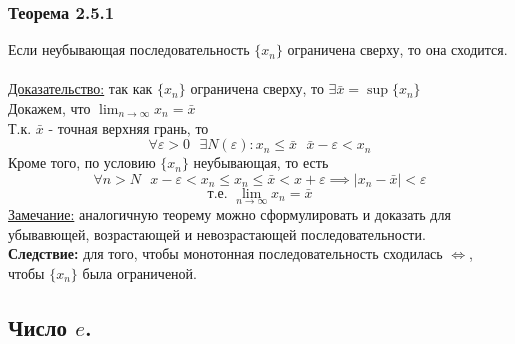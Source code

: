 \documentclass[12pt]{article}
\begin{document}
    \subsubsection*{Теорема 2.5.1}\label{th:2.5.1}
    Если неубывающая последовательность $\{x_n\}$ ограничена сверху, то она сходится.\\\\
    \underline{Доказательство:} так как $\{x_n\}$ ограничена сверху, то $\exists \bar{x} = \sup \{x_n\}$\\
    Докажем, что $\lim_{n\to\infty}x_n = \bar{x}$\\
    Т.к. $\bar{x}$ - точная верхняя грань, то 
    \[
        \forall \varepsilon > 0 \text{ } \exists N(\varepsilon) : x_n \le \bar{x} \text{    } \bar{x} - \varepsilon < x_n
    \]
    Кроме того, по условию $\{x_n\}$ неубывающая, то есть
    \[
        \forall n > N \text{ } x - \varepsilon < x_n \le x_n \le \bar{x} < x + \varepsilon \implies |x_n-\bar{x}| < \varepsilon
    \]
    \[
        \text{т.е. }\lim_{n\to\infty}x_n = \bar{x}
    \]
    \underline{Замечание:} аналогичную теорему можно сформулировать и доказать для убывавющей, возрастающей и невозрастающей последовательности.\\
    \textbf{Следствие:} для того, чтобы монотонная последовательность сходилась $\Leftrightarrow$, чтобы $\{x_n\}$ была ограниченой.\\

    \subsection{Число $e$.}
\end{document}
